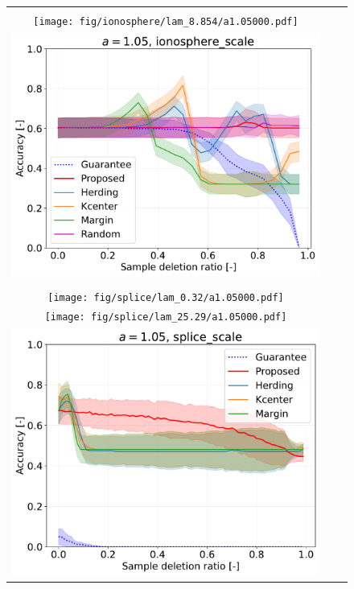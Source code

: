 \begin{figure}[H]
\begin{tabular}{ccc}
	&
	\begin{minipage}[b]{0.3\hsize}\centering {\small Dataset: ionosphere, $\lambda=n \cdot 10^{-1.5}$}\\\texttt{[image: fig/ionosphere/lam\_8.854/a1.05000.pdf]}\end{minipage}
	&
	\begin{minipage}[b]{0.3\hsize}\centering {\small Dataset: ionosphere, $\lambda=n$}\\\includegraphics[width=0.8\hsize]{fig/ionosphere/lam_280/a1.05000.pdf}\end{minipage}
	\\
	\begin{minipage}[b]{0.3\hsize}\centering {\small Dataset: splice, $\lambda=\lambda_\mathrm{best}$}\\\texttt{[image: fig/splice/lam\_0.32/a1.05000.pdf]}\end{minipage}
	&
	\begin{minipage}[b]{0.3\hsize}\centering {\small Dataset: splice, $\lambda=n_\mathrm \cdot 10^{-1.5}$}\\\texttt{[image: fig/splice/lam\_25.29/a1.05000.pdf]}\end{minipage}
	&
	\begin{minipage}[b]{0.3\hsize}\centering {\small Dataset: splice, $\lambda=n$}\\\includegraphics[width=0.8\hsize]{fig/splice/lam_800/a1.05000.pdf}\end{minipage}
	\\


\end{tabular}
\end{figure}
